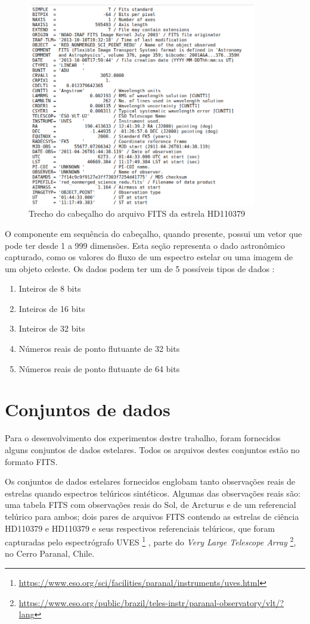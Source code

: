 \begin{figure}[htb]
\centering
\includegraphics[width=10cm]{figuras/fits_header.png}
\caption{Trecho do cabeçalho do arquivo FITS da estrela HD110379}
\label{fig:fits-header}
\end{figure}

O componente em sequência do cabeçalho, quando presente, possui um vetor que pode ter desde 1 a 999 dimensões. Esta seção representa o dado astronômico capturado, como os valores do fluxo de um espectro estelar ou uma imagem de um objeto celeste. Os dados podem ter um de 5 possíveis tipos de dados \citep{pence2010definition}:

\begin{enumerate}
    \item Inteiros de 8 bits
    \item Inteiros de 16 bits
    \item Inteiros de 32 bits
    \item Números reais de ponto flutuante de 32 bits
    \item Números reais de ponto flutuante de 64 bits
\end{enumerate}

\section{Conjuntos de dados}

Para o desenvolvimento dos experimentos destre trabalho, foram fornecidos alguns conjuntos de dados estelares. Todos os arquivos destes conjuntos estão no formato FITS.

Os conjuntos de dados estelares fornecidos englobam tanto observações reais de estrelas quando espectros telúricos sintéticos. Algumas das observações reais são: uma tabela FITS com observações reais do Sol, de Arcturus e de um referencial telúrico para ambos; dois pares de arquivos FITS contendo as estrelas de ciência HD110379 e HD110379 e seus respectivos referenciais telúricos, que foram capturadas pelo espectrógrafo UVES \footnote{\url{https://www.eso.org/sci/facilities/paranal/instruments/uves.html}} \citep{2000SPIE.4008..534D}, parte do \textit{Very Large Telescope Array} \footnote{\url{https://www.eso.org/public/brazil/teles-instr/paranal-observatory/vlt/?lang}}, no Cerro Paranal, Chile.  

